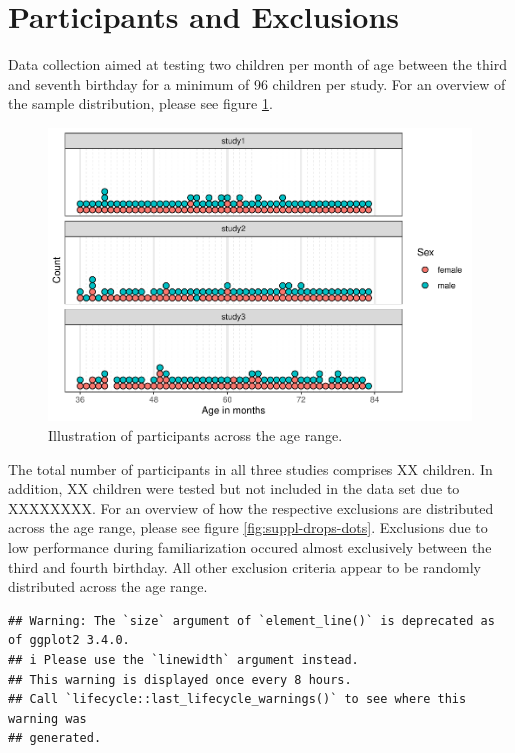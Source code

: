 \documentclass[
  man]{apa6}
\begin{document}
\newpage

\appendix


\section{Participants and Exclusions}\label{participants-and-exclusions}

Data collection aimed at testing two children per month of age between the third and seventh birthday for a minimum of 96 children per study. For an overview of the sample distribution, please see figure \ref{fig:suppl-participants-dots}.

\begin{figure}

{\centering \includegraphics{symlit_rep_manuscript_files/figure-latex/suppl-participants-dots-1} 

}

\caption{Illustration of participants across the age range.}\label{fig:suppl-participants-dots}
\end{figure}

The total number of participants in all three studies comprises XX children. In addition, XX children were tested but not included in the data set due to XXXXXXXX. For an overview of how the respective exclusions are distributed across the age range, please see figure \ref{fig:suppl-drops-dots}. Exclusions due to low performance during familiarization occured almost exclusively between the third and fourth birthday. All other exclusion criteria appear to be randomly distributed across the age range.

\begin{verbatim}
## Warning: The `size` argument of `element_line()` is deprecated as of ggplot2 3.4.0.
## i Please use the `linewidth` argument instead.
## This warning is displayed once every 8 hours.
## Call `lifecycle::last_lifecycle_warnings()` to see where this warning was
## generated.
\end{verbatim}
\end{document}
